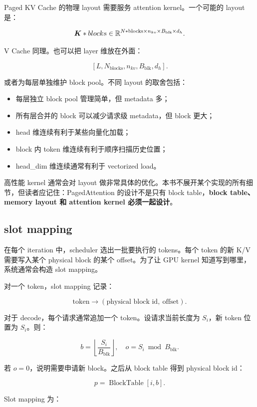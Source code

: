 Paged KV Cache 的物理 layout 需要服务 attention kernel。一个可能的 layout 是：

\[
\bm{K}*{blocks}
\in
\mathbb{R}^{
N*{\mathrm{blocks}}
\times
n_{kv}
\times
B_{\mathrm{blk}}
\times
d_h
}.
\]

V Cache 同理。也可以把 layer 维放在外面：

\[
[L,N_{\mathrm{blocks}},n_{kv},B_{\mathrm{blk}},d_h].
\]

或者为每层单独维护 block pool。不同 layout 的取舍包括：

\begin{itemize}
\item 每层独立 block pool 管理简单，但 metadata 多；
\item 所有层合并的 block 可以减少请求级 metadata，但 block 更大；
\item head 维连续有利于某些向量化加载；
\item block 内 token 维连续有利于顺序扫描历史位置；
\item head_dim 维连续通常有利于 vectorized load。
\end{itemize}

高性能 kernel 通常会对 layout 做非常具体的优化。本书不展开某个实现的所有细节，但读者应记住：PagedAttention 的设计不是只有 block table，\textbf{block table、memory layout 和 attention kernel 必须一起设计}。

\subsection{slot mapping}
\label{subsec:slot-mapping}

在每个 iteration 中，scheduler 选出一批要执行的 tokens。每个 token 的新 K/V 需要写入某个 physical block 的某个 offset。为了让 GPU kernel 知道写到哪里，系统通常会构造 slot mapping。

对一个 token，slot mapping 记录：

\[
\text{token}
\rightarrow
(\text{physical block id},\ \text{offset}).
\]

对于 decode，每个请求通常追加一个 token。设请求当前长度为 $S_i$，新 token 位置为 $S_i$。则：

\[
b=\left\lfloor\frac{S_i}{B_{\mathrm{blk}}}\right\rfloor,
\quad
o=S_i\bmod B_{\mathrm{blk}}.
\]

若 $o=0$，说明需要申请新 block。之后从 block table 得到 physical block id：

\[
p=\operatorname{BlockTable}[i,b].
\]

Slot mapping 为：

